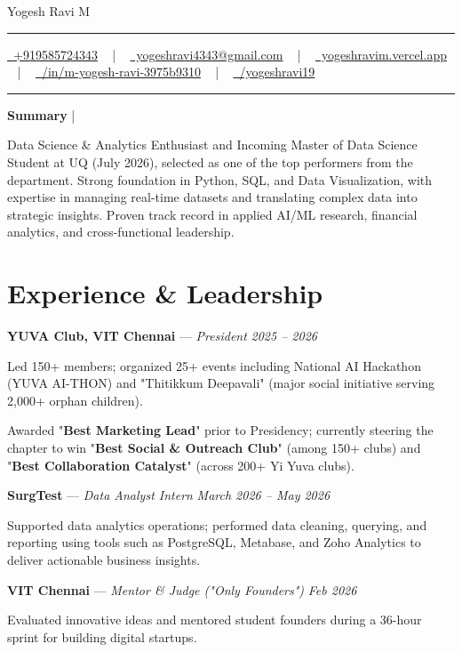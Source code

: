 \documentclass[letterpaper,10pt]{article}
\newcommand{\documentTitle}[2]{
  \begin{center}
    {\Huge\color{accentTitle} #1}
    \vspace{10pt}
    {\color{accentLine} \hrule}
    \vspace{2pt}
    \footnotesize{#2}
    \vspace{2pt}
    {\color{accentLine} \hrule}
  \end{center}
}
\newcommand{\tinysection}[1]{
  \phantomsection
  \addcontentsline{toc}{section}{#1}
  {\large{\bfseries\color{accentText}#1} {\color{accentLine} |}}
}
\newenvironment{resume_list}{
  \vspace{-7pt}
  \begin{itemize}[itemsep=-3px, parsep=0pt, leftmargin=30pt]
}{
  \end{itemize}
}
\begin{document}
\documentTitle{Yogesh Ravi M}{
  \href{tel:+919585724343}{\raisebox{-0.05\height} \faPhone\ +919585724343} ~ | ~
  \href{mailto:yogeshravi4343@gmail.com}{\raisebox{-0.15\height} \faEnvelope\ yogeshravi4343@gmail.com} ~ | ~
  \href{https://yogeshravim.vercel.app/}{\raisebox{-0.15\height} \faGlobe\ yogeshravim.vercel.app} ~ | ~
  \href{https://www.linkedin.com/in/m-yogesh-ravi-3975b9310/}{\raisebox{-0.15\height} \faLinkedin\ /in/m-yogesh-ravi-3975b9310} ~ | ~
  \href{https://github.com/yogeshravi19}{\raisebox{-0.15\height} \faGithub\ /yogeshravi19}
}

\tinysection{Summary}
Data Science \& Analytics Enthusiast and Incoming Master of Data Science Student at UQ (July 2026), selected as one of the top performers from the department. Strong foundation in Python, SQL, and Data Visualization, with expertise in managing real-time datasets and translating complex data into strategic insights. Proven track record in applied AI/ML research, financial analytics, and cross-functional leadership.

\section{Experience \& Leadership}

\textbf{YUVA Club, VIT Chennai} — \textit{President} \hfill \textit{2025 -- 2026}
\begin{resume_list}
  \item Led 150+ members; organized 25+ events including National AI Hackathon (YUVA AI-THON) and "Thitikkum Deepavali" (major social initiative serving 2,000+ orphan children).
  \item Awarded "\textbf{Best Marketing Lead}" prior to Presidency; currently steering the chapter to win "\textbf{Best Social \& Outreach Club}" (among 150+ clubs) and "\textbf{Best Collaboration Catalyst}" (across 200+ Yi Yuva clubs).
\end{resume_list}



\textbf{SurgTest} — \textit{Data Analyst Intern} \hfill \textit{March 2026 -- May 2026}
\begin{resume_list}
  \item Supported data analytics operations; performed data cleaning, querying, and reporting using tools such as PostgreSQL, Metabase, and Zoho Analytics to deliver actionable business insights.
\end{resume_list}

\textbf{VIT Chennai} — \textit{Mentor \& Judge ("Only Founders")} \hfill \textit{Feb 2026}
\begin{resume_list}
  \item Evaluated innovative ideas and mentored student founders during a 36-hour sprint for building digital startups.
\end{resume_list}
\end{document}
